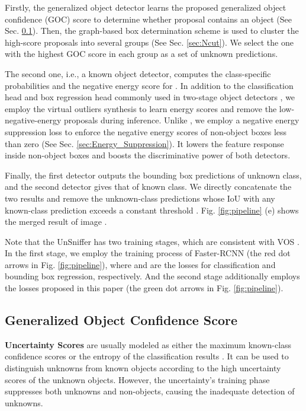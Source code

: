 \documentclass[10pt,twocolumn,letterpaper]{article}
\newcommand{\xf}[1]{{\color{black} #1}}
\newcommand{\MyScore}{Generalized Object Confidence Score\xspace}
\begin{document}
Firstly,
the generalized object detector learns the proposed generalized object confidence (GOC) score to determine whether proposal  contains an object (See Sec. \ref{sec:MyScore}).
Then, the graph-based box determination scheme is used to cluster the high-score proposals into several groups (See Sec. \ref{sec:Ncut}).
We select the one with the highest GOC score in each group \xf{as} a set of unknown predictions.

The second one, i.e., a known object detector,
computes the class-specific probabilities
and the negative energy score \cite{vos} for .
In addition to the classification head and box regression head commonly used in two-stage object detectors \cite{ren2015faster,he2017mask, lin2017feature,cai2018cascade},
we employ the virtual outliers synthesis \cite{vos} to learn energy scores
and remove the low-negative-energy proposals \xf{during} inference.
Unlike \cite{vos},
we employ a negative energy suppression loss to enforce the negative energy scores of non-object boxes less than zero (See Sec. \ref{sec:Energy_Suppression}).
It \xf{lowers} the feature response inside non-object boxes and boosts the discriminative power of both detectors.

Finally,
the first detector outputs the bounding box predictions of unknown class,
and the second detector gives that of known class.
We directly concatenate the two results and remove the unknown-class predictions whose IoU with any known-class prediction exceeds a constant threshold .
Fig. \ref{fig:pipeline} (e) shows the merged result of image .

Note that the UnSniffer has two training stages,
which \xf{are} consistent with VOS \cite{vos}.
In the first stage,
we employ the training process of Faster-RCNN \cite{ren2015faster}
(the red dot arrows in Fig. \ref{fig:pipeline}),
where  and  are the losses for classification and bounding box regression, respectively.
And the second stage additionally employs the losses proposed in this paper (the green dot arrows in Fig. \ref{fig:pipeline}).



\subsection{\MyScore}
\label{sec:MyScore}

\noindent\textbf{Uncertainty \xf{Scores}} \xf{are} usually modeled as either the maximum known-class conﬁdence \xf{scores} \cite{hendrycks2016baseline,liang2017enhancing} or the entropy of the classification results \cite{liu2020energy, vos, du2022unknown}.
It can be used to distinguish unknowns from known objects according to the high uncertainty \xf{scores} of the unknown objects.
However,
the uncertainty's training phase suppresses both unknowns and non-objects,
causing the inadequate detection of unknowns.
\end{document}
